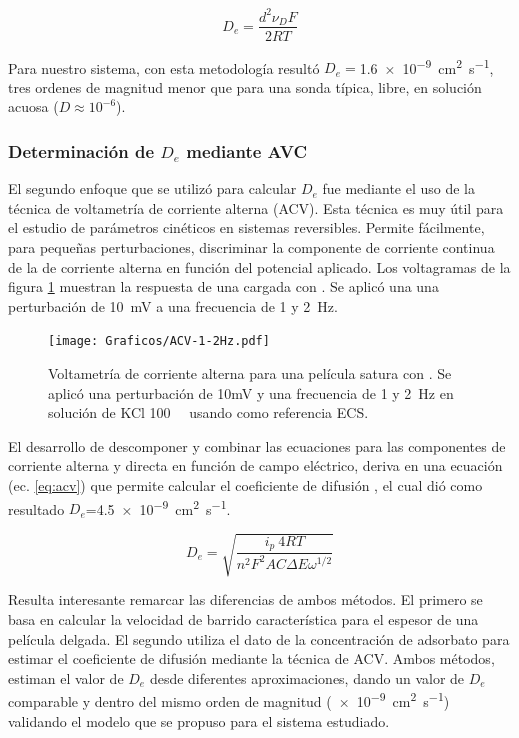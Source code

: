 		 		\begin{equation}
					D_e= \frac{d^2\nu_{\scriptscriptstyle{D}}F}{2RT}
					\label{eq:dh}
			\end{equation}

		 \pagebreak Para nuestro sistema, con esta metodología resultó $D_e=$\SI{1.6e-9}{\square\cm\per\second}, tres ordenes de magnitud menor que para una sonda típica, libre, en solución acuosa ($D\approx 10^{-6}$).  
			
	 \subsubsection*{Determinación de $D_e$ mediante AVC}

    	 El segundo enfoque que se utilizó para calcular $D_e$ fue mediante el uso de la técnica de voltametría de corriente alterna (ACV). Esta técnica es muy útil para el estudio de parámetros cinéticos en sistemas reversibles. Permite fácilmente, para pequeñas perturbaciones, discriminar la componente de corriente continua de la de corriente alterna en función del potencial aplicado. Los voltagramas de la figura \ref{fig:acv} muestran la respuesta de una \pdmF\space cargada con \ru. Se aplicó una una perturbación de \SI{10}{\milli\volt} a una frecuencia de 1 y \SI{2}{\hertz}.

	 			\begin{figure}[h!]
					\centering
			 	    \texttt{[image: Graficos/ACV-1-2Hz.pdf]}
			        \caption[Voltametrías de corriente alterna]{Voltametría de corriente alterna para una película satura con \ru. Se aplicó una perturbación de 10mV y una frecuencia de 1 y \SI{2}{\hertz} en solución de KCl \SI{100}{\milli\Molar} usando como referencia ECS.}
			        \label{fig:acv}
			        \vspace*{3mm}
			      	\end{figure}

    	 El desarrollo de descomponer y combinar las ecuaciones para las componentes de corriente alterna y directa en función de campo eléctrico, deriva en una ecuación (ec. \ref{eq:acv}) que permite calcular el coeficiente de difusión \cite{Wi2000}, el cual dió como resultado $D_e$=\SI{4.5e-9}{\square\cm\per\second}. 
    	 	
    	 		\begin{equation}
					D_e=\sqrt{\frac{i_p\ 4RT}{n^2 F^2 A C \Delta E \omega ^{1/2}}}
					\label{eq:acv}
				 \end{equation}

		
		 Resulta interesante remarcar las diferencias de ambos métodos. El primero se basa en calcular la velocidad de barrido característica para el espesor de una película delgada. El segundo utiliza el dato de la concentración de adsorbato para estimar el coeficiente de difusión mediante la técnica de ACV. Ambos métodos, estiman el valor de $D_e$ desde diferentes aproximaciones, dando un valor de $D_e$ comparable y dentro del mismo orden de magnitud (\SI{e-9}{\square\cm\per\second}) validando el modelo que se propuso para el sistema estudiado.
			
